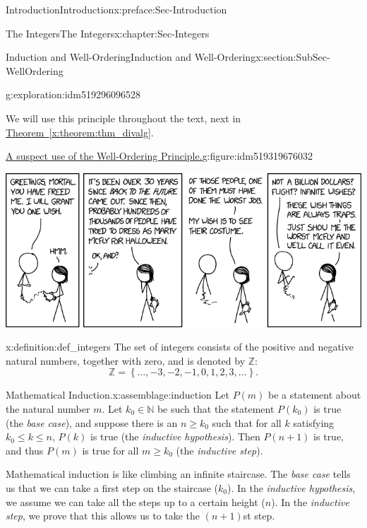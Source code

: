 \documentclass[oneside,10pt,]{book}
\newcommand{\xreffont}{\relax}
\numberwithin{equation}{section}
\renewcommand{\le}{\leqslant}
\renewcommand{\ge}{\geqslant}
\newcommand{\set}[1]{\left\{ {#1} \right\}}
\def\Z{{\mathbb Z}}
\def\N{{\mathbb N}}
\begin{document}
\begin{preface}{Introduction}{}{Introduction}{}{}{x:preface:Sec-Introduction}
\begin{chapterptx}{The Integers}{}{The Integers}{}{}{x:chapter:Sec-Integers}
\begin{sectionptx}{Induction and Well-Ordering}{}{Induction and Well-Ordering}{}{}{x:section:SubSec-WellOrdering}
\begin{exploration}{}{g:exploration:idm519296096528}
\begin{enumerate}
\end{enumerate}
\end{exploration}
We will use this principle throughout the text, next in \hyperref[x:theorem:thm_divalg]{Theorem~{\xreffont\ref{x:theorem:thm_divalg}}}.%
\begin{figureptx}{\href{https://www.xkcd.com/2193/}{A suspect use of the Well-Ordering Principle.}}{g:figure:idm519319676032}{}%
\begin{image}{0.175}{0.65}{0.175}%
\includegraphics[width=\linewidth]{images/well_ordering_principle.png}
\end{image}%
\tcblower
\end{figureptx}%
\begin{definition}{}{x:definition:def_integers}%
\index{\(\Z\)} The set of integers consists of the positive and negative natural numbers, together with zero, and is denoted by \(\Z\):%
\begin{equation*}
\Z = \set{\ldots, -3, -2, -1, 0, 1, 2, 3, \ldots}\text{.}
\end{equation*}
%
\end{definition}
\begin{assemblage}{Mathematical Induction.}{x:assemblage:induction}%
Let \(P(m)\) be a statement about the natural number \(m\)\footnotemark{}. Let \(k_0\in \N\) be such that the statement \(P(k_0)\) is true (the \emph{base case}), and suppose there is an \(n\ge k_0\) such that for all \(k\) satisfying \(k_0 \le k \le n\), \(P(k)\) is true (the \emph{inductive hypothesis}). Then \(P(n+1)\) is true, and thus \(P(m)\) is true for all \(m\ge k_0\) (the \emph{inductive step}).%
\end{assemblage}
%
Mathematical induction is like climbing an infinite staircase. The \emph{base case} tells us that we can take a first step on the staircase (\(k_0\)). In the \emph{inductive hypothesis}, we assume we can take all the steps up to a certain height (\(n\)). In the \emph{inductive step}, we prove that this allows us to take the \((n+1)\)st step.%

\end{sectionptx}
\end{chapterptx}
\end{preface}
\end{document}
